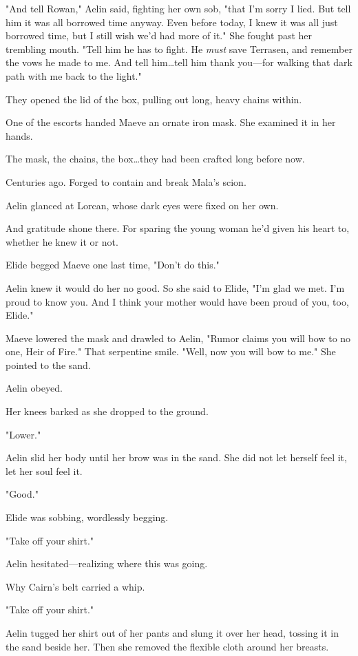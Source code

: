 "And tell Rowan," Aelin said, fighting her own sob, "that I'm sorry I lied.
But tell him it was all borrowed time anyway.
Even before today, I knew it was all just borrowed time, but I still wish we'd had more of it."
She fought past her trembling mouth.
"Tell him he has to fight.
He \emph{must} save Terrasen, and remember the vows he made to me.
And tell him\ldots tell him thank you---for walking that dark path with me back to the light."

They opened the lid of the box, pulling out long, heavy chains within.

One of the escorts handed Maeve an ornate iron mask.
She examined it in her hands.

The mask, the chains, the box\ldots they had been crafted long before now.

Centuries ago.
Forged to contain and break Mala's scion.

Aelin glanced at Lorcan, whose dark eyes were fixed on her own.

And gratitude shone there.
For sparing the young woman he'd given his heart to, whether he knew it or not.

Elide begged Maeve one last time, "Don't do this."

Aelin knew it would do her no good.
So she said to Elide, "I'm glad we met.
I'm proud to know you.
And I think your mother would have been proud of you, too, Elide."

Maeve lowered the mask and drawled to Aelin, "Rumor claims you will bow to no one, Heir of Fire."
That serpentine smile.
"Well, now you will bow to me."
She pointed to the sand.

Aelin obeyed.

Her knees barked as she dropped to the ground.

"Lower."

Aelin slid her body until her brow was in the sand.
She did not let herself feel it, let her soul feel it.

"Good."

Elide was sobbing, wordlessly begging.

"Take off your shirt."

Aelin hesitated---realizing where this was going.

Why Cairn's belt carried a whip.

"Take off your shirt."

Aelin tugged her shirt out of her pants and slung it over her head, tossing it in the sand beside her.
Then she removed the flexible cloth around her breasts.

